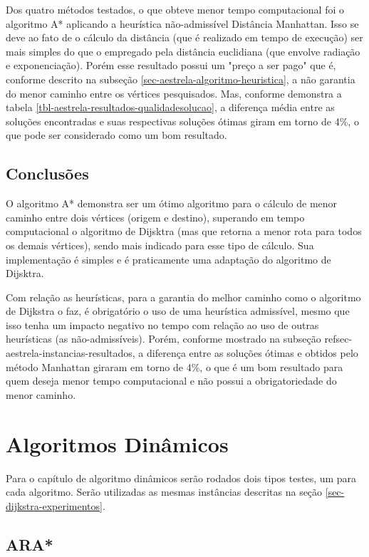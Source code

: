Dos quatro métodos testados, o que obteve menor tempo computacional foi o algoritmo A* aplicando a heurística não-admissível Distância Manhattan. Isso se deve ao fato de o cálculo da distância (que é realizado em tempo de execução) ser mais simples do que o empregado pela distância euclidiana (que envolve radiação e exponenciação). Porém esse resultado possui um "preço a ser pago" que é, conforme descrito na subseção \ref{sec-aestrela-algoritmo-heuristica}, a não garantia do menor caminho entre os vértices pesquisados. Mas, conforme demonstra a tabela \ref{tbl-aestrela-resultados-qualidadesolucao}, a diferença média entre as soluções encontradas e suas respectivas soluções ótimas giram em torno de 4\%, o que pode ser considerado como um bom resultado.

\subsection{Conclusões}
\label{sec-aestrela-conclusao}
O algoritmo A* demonstra ser um ótimo algoritmo para o cálculo de menor caminho entre dois vértices (origem e destino), superando em tempo computacional o algoritmo de Dijsktra (mas que retorna a menor rota para todos os demais vértices), sendo mais indicado para esse tipo de cálculo. Sua implementação é simples e é praticamente uma adaptação do algoritmo de Dijsktra.

Com relação as heurísticas, para a garantia do melhor caminho como o algoritmo de Dijkstra o faz, é obrigatório o uso de uma heurística admissível, mesmo que isso tenha um impacto negativo no tempo com relação ao uso de outras heurísticas (as não-admissíveis). Porém, conforme mostrado na subseção ref{sec-aestrela-instancias-resultados}, a diferença entre as soluções ótimas e obtidos pelo método Manhattan giraram em torno de 4\%, o que é um bom resultado para quem deseja menor tempo computacional e não possui a obrigatoriedade do menor caminho.

\section{Algoritmos Dinâmicos}
\label{sec-experimentos-dinamicos}
Para o capítulo de algoritmo dinâmicos serão rodados dois tipos testes, um para cada algoritmo. Serão utilizadas as mesmas instâncias descritas na seção \ref{sec-dijkstra-experimentos}.

\subsection{ARA*}
\label{sec-experimentos-dinamicos-ara}

